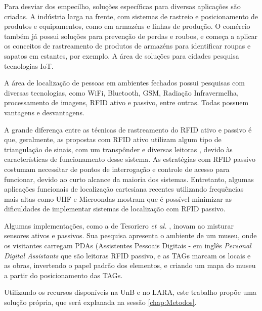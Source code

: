 Para desviar dos empecilho, soluções específicas para diversas aplicações são criadas. A indústria larga na frente, com sistemas de rastreio e posicionamento de produtos e equipamentos, como em armazéns e linhas de produção. O comércio também já possui soluções para prevenção de perdas e roubos, e começa a aplicar os conceitos de rastreamento de produtos de armazéns para identificar roupas e sapatos em estantes, por exemplo. A área de soluções para cidades pesquisa tecnologias IoT.

A área de localização de pessoas em ambientes fechados possui pesquisas com diversas tecnologias, como WiFi, Bluetooth, GSM, Radiação Infravermelha, processamento de imagens, RFID ativo e passivo, entre outras. Todas possuem vantagens e desvantagens.

A grande diferença entre as técnicas de rastreamento do RFID ativo e passivo é que, geralmente, as propostas com RFID ativo utilizam algum tipo de triangulação de sinais, com um transpônder e diversas leitoras \cite{bouet2008rfid} \cite{jin2006indoor} \cite{sanpechuda2008review}, devido às características de funcionamento desse sistema. As estratégias com RFID passivo costumam necessitar de pontos de interrogação e controle de acesso para funcionar, devido ao curto alcance da maioria dos sistemas. Entretanto, algumas aplicações funcionais de localização cartesiana recentes utilizando frequências mais altas como UHF e Microondas \cite{xarray} mostram que é possível minimizar as dificuldades de implementar sistemas de localização com RFID passivo.

Algumas implementações, como a de Tesoriero \textit{et al.} \cite{tesoriero2008using}, inovam ao misturar sensores ativos e passivos. Sua pesquisa apresenta o ambiente de um museu, onde os visitantes carregam PDAs (Assistentes Pessoais Digitais - em inglês \textit{Personal Digital Assistants} que são leitoras RFID passivo, e as TAGs marcam os locais e as obras, invertendo o papel padrão dos elementos, e criando um mapa do museu a partir do posicionamento das TAGs.

Utilizando os recursos disponíveis na UnB e no LARA, este trabalho propõe uma solução própria, que será explanada na sessão \ref{chap:Metodos}.
